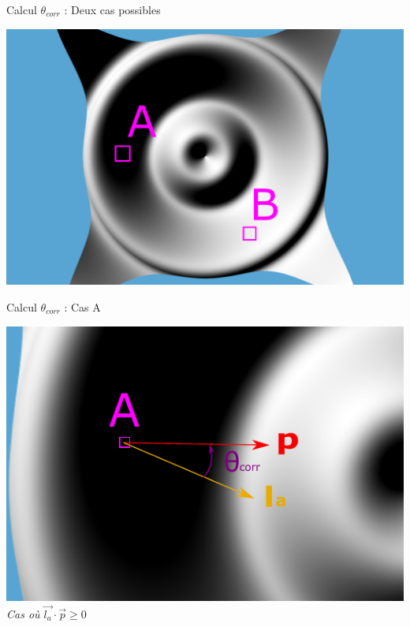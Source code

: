 \documentclass{beamer}
\begin{document}
\begin{frame}{Calcul $\theta_{corr}$ : Deux cas possibles}
\begin{center}
\includegraphics[width=0.8\linewidth]{Schema/orientationTheta_Image_1.pdf}
\end{center}

	


\end{frame}

\begin{frame}{Calcul $\theta_{corr}$ : Cas A}
\begin{center}
\includegraphics[width=0.8\linewidth]{Schema/orientationTheta_Image_2.pdf}\\
\textit{Cas où $\vec{l_a}\cdot \vec{p} \geq 0$}
\end{center}

	


\end{frame}
\end{document}
